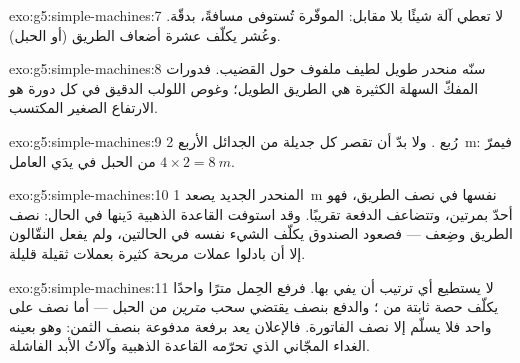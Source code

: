 \begin{solution}{exo:g5:simple-machines:7}
لا تعطي آلة شيئًا بلا مقابل:  الموفّرة تُستوفى مسافةً،
بدقّة. وعُشر  يكلّف عشرة أضعاف الطريق (أو الحبل).
\end{solution}

\begin{solution}{exo:g5:simple-machines:8}
سنّه منحدر طويل لطيف ملفوف حول القضيب. فدورات المفكّ السهلة
الكثيرة هي الطريق الطويل؛ وغوص اللولب الدقيق في كل دورة هو
الارتفاع الصغير المكتسب.
\end{solution}

\begin{solution}{exo:g5:simple-machines:9}
رُبع . ولا بدّ أن تقصر كل جديلة من الجدائل الأربع
\qty{2}{m}: فيمرّ $4 \times 2 = \qty{8}{m}$ من الحبل في يدَي
العامل.
\end{solution}

\begin{solution}{exo:g5:simple-machines:10}
المنحدر الجديد يصعد \qty{1}{m} نفسها في نصف الطريق، فهو أحدّ
بمرتين، وتتضاعف الدفعة تقريبًا. وقد استوفت القاعدة الذهبية
دَينها في الحال: نصف الطريق وضِعف  --- فصعود الصندوق يكلّف
الشيء نفسه في الحالتين، ولم يفعل النقّالون إلا أن بادلوا عملات
مريحة كثيرة بعملات ثقيلة قليلة.
\end{solution}

\begin{solution}{exo:g5:simple-machines:11}
لا يستطيع أي ترتيب أن يفي بها. فرفع الحِمل مترًا واحدًا يكلّف
حصة ثابتة من ؛ والدفع بنصف  يقتضي سحب \emph{مترين}
من الحبل --- أما نصف  على  واحد فلا يسلّم إلا نصف
الفاتورة. فالإعلان يعد برفعة مدفوعة بنصف الثمن: وهو بعينه
الغداء المجّاني الذي تحرّمه القاعدة الذهبية وآلاتُ الأبد
الفاشلة.
\end{solution}
